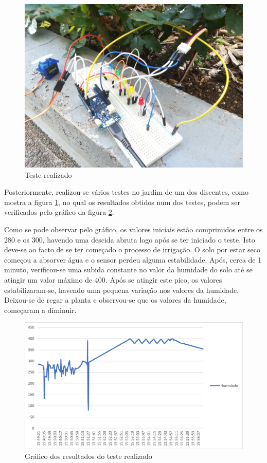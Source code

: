 \documentclass[conference]{IEEEtran}
\begin{document}
\begin{figure}[h]
    \centering
    \includegraphics[scale=0.06]{sistema-de-rega-teste-ambiente-real.jpg}
    \caption{Teste realizado}
    \label{fig:teste}
\end{figure}

Posteriormente, realizou-se vários testes no jardim de um dos discentes, como mostra a figura \ref{fig:teste}, 
no qual os resultados obtidos num dos testes, podem ser verificados pelo gráfico da figura \ref{fig:graphic}. 

Como se pode observar pelo gráfico, os valores iniciais estão comprimidos entre os 280 e os 300, 
havendo uma descida abruta logo após se ter iniciado o teste. Isto deve-se ao facto de se ter começado 
o processo de irrigação. O solo por estar seco começou a absorver água e o sensor perdeu alguma estabilidade.
Após, cerca de 1 minuto, verificou-se uma subida constante no valor da humidade do solo até se atingir 
um valor máximo de 400. Após se atingir este pico, os valores estabilizaram-se, havendo uma pequena variação 
nos valores da humidade. Deixou-se de regar a planta e observou-se que os valores da humidade, começaram 
a diminuir.

\begin{figure}
    \centering
    \includegraphics[scale=0.5]{humidity-test-graph.png}
    \caption{Gráfico dos resultados do teste realizado}
    \label{fig:graphic}
\end{figure}
\end{document}
